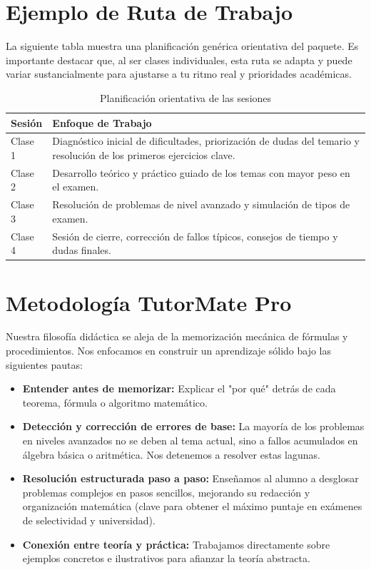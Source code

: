 \documentclass[11pt,a4paper]{article}
\begin{document}
\section{Ejemplo de Ruta de Trabajo}
La siguiente tabla muestra una planificación genérica orientativa del paquete. Es importante destacar que, al ser clases individuales, esta ruta se adapta y puede variar sustancialmente para ajustarse a tu ritmo real y prioridades académicas.

\begin{table}[h]
\centering
\renewcommand{\arraystretch}{1.3}
\begin{tabular}{|l|p{11cm}|}
\hline
\rowcolor{primary}
\color{white}\textbf{Sesión} & \color{white}\textbf{Enfoque de Trabajo} \\ \hline
 Clase 1 & Diagnóstico inicial de dificultades, priorización de dudas del temario y resolución de los primeros ejercicios clave. \\ \hline
 Clase 2 & Desarrollo teórico y práctico guiado de los temas con mayor peso en el examen. \\ \hline
 Clase 3 & Resolución de problemas de nivel avanzado y simulación de tipos de examen. \\ \hline
 Clase 4 & Sesión de cierre, corrección de fallos típicos, consejos de tiempo y dudas finales. \\ \hline
\end{tabular}
\caption{Planificación orientativa de las sesiones}
\end{table}

\newpage
\section{Metodología TutorMate Pro}
Nuestra filosofía didáctica se aleja de la memorización mecánica de fórmulas y procedimientos. Nos enfocamos en construir un aprendizaje sólido bajo las siguientes pautas:
\begin{itemize}
    \item \textbf{Entender antes de memorizar:} Explicar el "por qué" detrás de cada teorema, fórmula o algoritmo matemático.
    \item \textbf{Detección y corrección de errores de base:} La mayoría de los problemas en niveles avanzados no se deben al tema actual, sino a fallos acumulados en álgebra básica o aritmética. Nos detenemos a resolver estas lagunas.
    \item \textbf{Resolución estructurada paso a paso:} Enseñamos al alumno a desglosar problemas complejos en pasos sencillos, mejorando su redacción y organización matemática (clave para obtener el máximo puntaje en exámenes de selectividad y universidad).
    \item \textbf{Conexión entre teoría y práctica:} Trabajamos directamente sobre ejemplos concretos e ilustrativos para afianzar la teoría abstracta.
\end{itemize}
\end{document}
